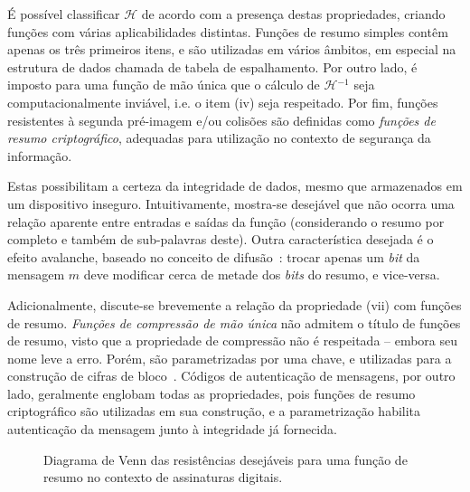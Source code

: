 \documentclass[12pt,notitlepage]{report}
\newcommand{\hh}{\mathcal{H}}
\def\precircle{(0.00, 0) circle (1.25cm)}
\def\seccircle{(1.75, 0) circle (1.25cm)}
\def\colcircle{(1.75, 0) circle (0.75cm)}
\begin{document}
É possível classificar $\hh{}$ de acordo com a presença destas propriedades,
criando funções com várias aplicabilidades distintas. Funções de
resumo simples contêm apenas os três primeiros itens, e são utilizadas em
vários âmbitos, em especial na estrutura de dados chamada de tabela de
espalhamento. Por outro lado, é imposto para uma função de mão única que
o cálculo de $\hh{}^{-1}$ seja computacionalmente inviável, i.e. o item (iv)
seja respeitado. Por fim, funções resistentes à segunda pré-imagem e/ou colisões
são definidas como \emph{funções de resumo criptográfico}, adequadas para
utilização no contexto de segurança da informação. 

Estas possibilitam a certeza da integridade de dados, mesmo que armazenados em
um dispositivo inseguro. Intuitivamente, mostra-se desejável que não ocorra
uma relação aparente entre entradas e saídas da função (considerando o resumo
por completo e também de sub-palavras deste). Outra característica desejada
é o efeito avalanche, baseado no conceito de
difusão~\cite{Stallings:2010:CNS:1824151}: trocar apenas um \emph{bit} da
mensagem $m$ deve modificar cerca de metade dos \emph{bits} do resumo, e
vice-versa.

Adicionalmente, discute-se brevemente a relação da propriedade (vii) com funções
de resumo. \emph{Funções de compressão de mão única} não admitem o título de funções
de resumo, visto que a propriedade de compressão não é respeitada -- embora seu
nome leve a erro. Porém, são parametrizadas por uma chave, e utilizadas para a
construção de cifras de bloco~\cite[9.25]{Menezes:1996:HAC:548089}. Códigos de
autenticação de mensagens, por outro lado, geralmente englobam todas as
propriedades, pois funções de resumo criptográfico são utilizadas em sua construção,
e a parametrização habilita autenticação da mensagem junto à integridade já
fornecida.

\begin{figure}[h]
  \centering
  \caption{Diagrama de Venn das resistências desejáveis para uma função de
    resumo no contexto de assinaturas digitais.}
  \label{fig:1}
\end{figure}
\end{document}
